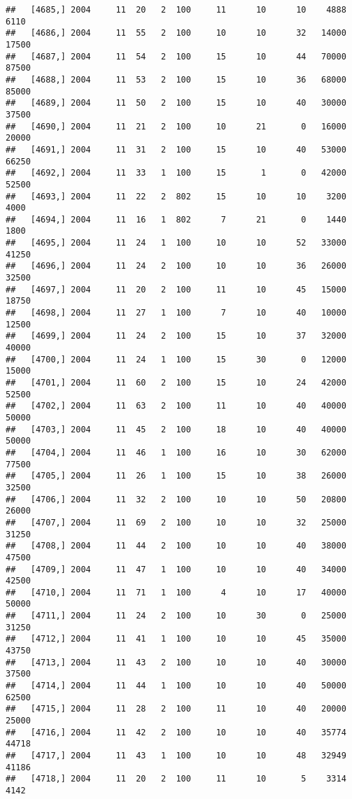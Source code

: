 \documentclass{article}\usepackage[]{graphicx}\usepackage[]{color}
\makeatletter
\newenvironment{kframe}{%
 \def\at@end@of@kframe{}%
 \ifinner\ifhmode%
  \def\at@end@of@kframe{\end{minipage}}%
  \begin{minipage}{\columnwidth}%
 \fi\fi%
 \def\FrameCommand##1{\hskip\@totalleftmargin \hskip-\fboxsep
 \colorbox{shadecolor}{##1}\hskip-\fboxsep
     \hskip-\linewidth \hskip-\@totalleftmargin \hskip\columnwidth}%
 \MakeFramed {\advance\hsize-\width
   \@totalleftmargin\z@ \linewidth\hsize
   \@setminipage}}%
 {\par\unskip\endMakeFramed%
 \at@end@of@kframe}
\newenvironment{knitrout}{}{} %
\makeatother
\begin{document}
\begin{knitrout}
\begin{kframe}
\begin{verbatim}
##   [4685,] 2004     11  20   2  100     11      10      10    4888    6110
##   [4686,] 2004     11  55   2  100     10      10      32   14000   17500
##   [4687,] 2004     11  54   2  100     15      10      44   70000   87500
##   [4688,] 2004     11  53   2  100     15      10      36   68000   85000
##   [4689,] 2004     11  50   2  100     15      10      40   30000   37500
##   [4690,] 2004     11  21   2  100     10      21       0   16000   20000
##   [4691,] 2004     11  31   2  100     15      10      40   53000   66250
##   [4692,] 2004     11  33   1  100     15       1       0   42000   52500
##   [4693,] 2004     11  22   2  802     15      10      10    3200    4000
##   [4694,] 2004     11  16   1  802      7      21       0    1440    1800
##   [4695,] 2004     11  24   1  100     10      10      52   33000   41250
##   [4696,] 2004     11  24   2  100     10      10      36   26000   32500
##   [4697,] 2004     11  20   2  100     11      10      45   15000   18750
##   [4698,] 2004     11  27   1  100      7      10      40   10000   12500
##   [4699,] 2004     11  24   2  100     15      10      37   32000   40000
##   [4700,] 2004     11  24   1  100     15      30       0   12000   15000
##   [4701,] 2004     11  60   2  100     15      10      24   42000   52500
##   [4702,] 2004     11  63   2  100     11      10      40   40000   50000
##   [4703,] 2004     11  45   2  100     18      10      40   40000   50000
##   [4704,] 2004     11  46   1  100     16      10      30   62000   77500
##   [4705,] 2004     11  26   1  100     15      10      38   26000   32500
##   [4706,] 2004     11  32   2  100     10      10      50   20800   26000
##   [4707,] 2004     11  69   2  100     10      10      32   25000   31250
##   [4708,] 2004     11  44   2  100     10      10      40   38000   47500
##   [4709,] 2004     11  47   1  100     10      10      40   34000   42500
##   [4710,] 2004     11  71   1  100      4      10      17   40000   50000
##   [4711,] 2004     11  24   2  100     10      30       0   25000   31250
##   [4712,] 2004     11  41   1  100     10      10      45   35000   43750
##   [4713,] 2004     11  43   2  100     10      10      40   30000   37500
##   [4714,] 2004     11  44   1  100     10      10      40   50000   62500
##   [4715,] 2004     11  28   2  100     11      10      40   20000   25000
##   [4716,] 2004     11  42   2  100     10      10      40   35774   44718
##   [4717,] 2004     11  43   1  100     10      10      48   32949   41186
##   [4718,] 2004     11  20   2  100     11      10       5    3314    4142

\end{verbatim}
\end{kframe}
\end{knitrout}
\end{document}
